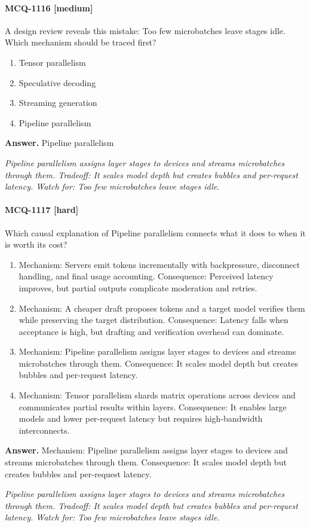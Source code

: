 \paragraph{MCQ-1116 [medium]} A design review reveals this mistake: Too few microbatches leave stages idle. Which mechanism should be traced first?
\begin{enumerate}[label=\Alph*.]
\item Tensor parallelism
\item Speculative decoding
\item Streaming generation
\item Pipeline parallelism
\end{enumerate}
\noindent\textbf{Answer.} Pipeline parallelism
\par\textit{Pipeline parallelism assigns layer stages to devices and streams microbatches through them. Tradeoff: It scales model depth but creates bubbles and per-request latency. Watch for: Too few microbatches leave stages idle.}
\paragraph{MCQ-1117 [hard]} Which causal explanation of Pipeline parallelism connects what it does to when it is worth its cost?
\begin{enumerate}[label=\Alph*.]
\item Mechanism: Servers emit tokens incrementally with backpressure, disconnect handling, and final usage accounting. Consequence: Perceived latency improves, but partial outputs complicate moderation and retries.
\item Mechanism: A cheaper draft proposes tokens and a target model verifies them while preserving the target distribution. Consequence: Latency falls when acceptance is high, but drafting and verification overhead can dominate.
\item Mechanism: Pipeline parallelism assigns layer stages to devices and streams microbatches through them. Consequence: It scales model depth but creates bubbles and per-request latency.
\item Mechanism: Tensor parallelism shards matrix operations across devices and communicates partial results within layers. Consequence: It enables large models and lower per-request latency but requires high-bandwidth interconnects.
\end{enumerate}
\noindent\textbf{Answer.} Mechanism: Pipeline parallelism assigns layer stages to devices and streams microbatches through them. Consequence: It scales model depth but creates bubbles and per-request latency.
\par\textit{Pipeline parallelism assigns layer stages to devices and streams microbatches through them. Tradeoff: It scales model depth but creates bubbles and per-request latency. Watch for: Too few microbatches leave stages idle.}
